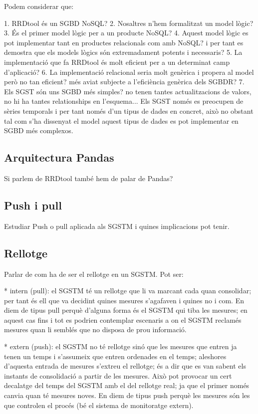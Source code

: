 Podem considerar que:

1. RRDtool és un SGBD NoSQL?
2. Nosaltres n'hem formalitzat un model lògic?
3. És el primer model lògic per a un producte NoSQL?
4. Aquest model lògic es pot implementar tant en productes relacionals com amb NoSQL? i per tant es demostra que els models lògics són extremadament potents i necessaris?
5. La implementació que fa RRDtool és molt eficient per a un determinat camp d'aplicació?
6. La implementació relacional seria molt genèrica i propera al model però no tan eficient? més aviat subjecte a l'eficiència genèrica dels SGBDR?
7. Els SGST són uns SGBD més simples? no tenen tantes actualitzacions de valors, no hi ha tantes relationships en l'esquema... Els SGST només es preocupen de sèries temporals i per tant només d'un tipus de dades en concret, això no obstant tal com s'ha dissenyat el model aquest tipus de dades es pot implementar en SGBD més complexos. 

\subsection{Arquitectura Pandas}

\todo{}
Si parlem de RRDtool també hem de palar de Pandas?




\subsection{Push i pull}

Estudiar Push o pull aplicada als SGSTM i quines implicacions pot tenir.


\subsection{Rellotge}

Parlar de com ha de ser el rellotge en un SGSTM. Pot ser:

* intern (pull): el SGSTM té un rellotge que li va marcant cada quan consolidar; per tant és ell que va decidint quines mesures s'agafaven i quines no i com. En diem de tipus pull perquè d'alguna forma és el SGSTM qui tiba les mesures; en aquest cas fins i tot es podrien contemplar escenaris a on el SGSTM reclamés mesures quan li semblés que no disposa de prou informació.

* extern (push): el SGSTM no té rellotge sinó que les mesures que entren ja tenen un temps i s'assumeix que entren ordenades en el temps; aleshores d'aquesta entrada de mesures s'extreu el rellotge; és a dir que es van sabent els instants de consolidació a partir de les mesures. Això pot provocar un cert decalatge del temps del SGSTM amb el del rellotge real; ja que el primer només canvia quan té mesures noves. En diem de tipus push perquè les mesures són les que controlen el procés (bé el sistema de monitoratge extern). 

